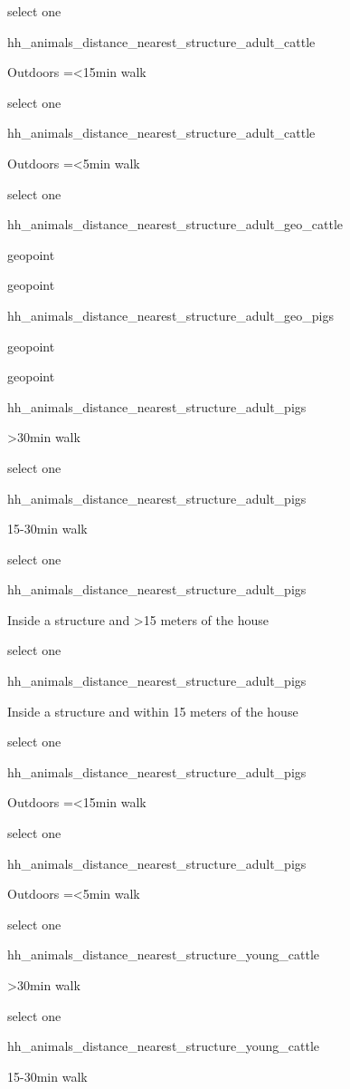 \documentclass[]{article}
\begin{document}
select one

hh\_animals\_distance\_nearest\_structure\_adult\_cattle

Outdoors =\textless{}15min walk

select one

hh\_animals\_distance\_nearest\_structure\_adult\_cattle

Outdoors =\textless{}5min walk

select one

hh\_animals\_distance\_nearest\_structure\_adult\_geo\_cattle

geopoint

geopoint

hh\_animals\_distance\_nearest\_structure\_adult\_geo\_pigs

geopoint

geopoint

hh\_animals\_distance\_nearest\_structure\_adult\_pigs

\textgreater{}30min walk

select one

hh\_animals\_distance\_nearest\_structure\_adult\_pigs

15-30min walk

select one

hh\_animals\_distance\_nearest\_structure\_adult\_pigs

Inside a structure and \textgreater{}15 meters of the house

select one

hh\_animals\_distance\_nearest\_structure\_adult\_pigs

Inside a structure and within 15 meters of the house

select one

hh\_animals\_distance\_nearest\_structure\_adult\_pigs

Outdoors =\textless{}15min walk

select one

hh\_animals\_distance\_nearest\_structure\_adult\_pigs

Outdoors =\textless{}5min walk

select one

hh\_animals\_distance\_nearest\_structure\_young\_cattle

\textgreater{}30min walk

select one

hh\_animals\_distance\_nearest\_structure\_young\_cattle

15-30min walk
\end{document}
